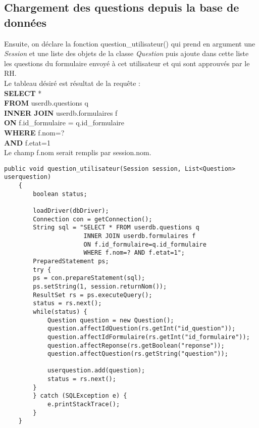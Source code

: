 \documentclass[12]{article}
\begin{document}
\subsection{Chargement des questions depuis la base de données}

Ensuite, on déclare la fonction question\_utilisateur() qui prend en argument une \textit{Session} et une liste des objets de la classe \textit{Question} puis ajoute dans cette liste les questions du formulaire envoyé à cet utilisateur et qui sont approuvés par le RH.\\


Le tableau désiré est résultat de la requête :\\
\textbf{SELECT} * \\
\textbf{FROM} userdb.questions q \\
\textbf{INNER JOIN} userdb.formulaires f \\
\textbf{ON} f.id\_formulaire = q.id\_formulaire\\
\textbf{WHERE} f.nom=? \\
\textbf{AND} f.etat=1\\

Le champ f.nom serait remplis par session.nom.



\begin{small}
\lstset{language=java}
\begin{lstlisting}
public void question_utilisateur(Session session, List<Question> userquestion)
	{
		boolean status;

		loadDriver(dbDriver);
		Connection con = getConnection();
		String sql = "SELECT * FROM userdb.questions q 
					  INNER JOIN userdb.formulaires f 
					  ON f.id_formulaire=q.id_formulaire 
					  WHERE f.nom=? AND f.etat=1";
		PreparedStatement ps;
		try {
		ps = con.prepareStatement(sql);
		ps.setString(1, session.returnNom());
		ResultSet rs = ps.executeQuery();
		status = rs.next();
		while(status) {
			Question question = new Question();
			question.affectIdQuestion(rs.getInt("id_question"));
			question.affectIdFormulaire(rs.getInt("id_formulaire"));
			question.affectReponse(rs.getBoolean("reponse"));
			question.affectQuestion(rs.getString("question"));

			userquestion.add(question);
			status = rs.next();
		}
		} catch (SQLException e) {
			e.printStackTrace();
		}
	}
\end{lstlisting}

\end{small}
\end{document}
